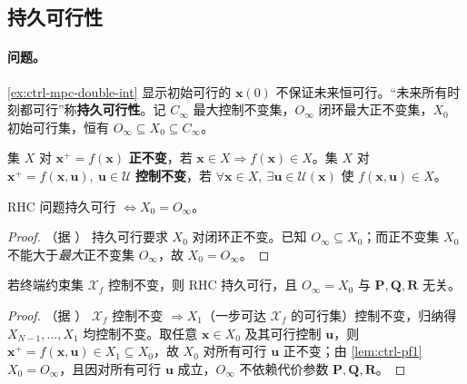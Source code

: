 \subsection{持久可行性}
\label{sec:ctrl-mpc-feasibility}

\paragraph{问题。}
\cref{ex:ctrl-mpc-double-int} 显示初始可行的 $\mathbf{x}(0)$ 不保证未来恒可行。“未来所有时刻都可行”称\textbf{持久可行性}\cite{borrelli2017predictive}。记 $C_\infty$ 最大控制不变集，$O_\infty$ 闭环最大正不变集，$X_0$ 初始可行集，恒有 $O_\infty\subseteq X_0\subseteq C_\infty$。

\begin{definition}[（控制）不变集]
\label{def:ctrl-invariant}
集 $X$ 对 $\mathbf{x}^+=f(\mathbf{x})$ \textbf{正不变}，若 $\mathbf{x}\in X\Rightarrow f(\mathbf{x})\in X$。集 $X$ 对 $\mathbf{x}^+=f(\mathbf{x},\mathbf{u}),\ \mathbf{u}\in\mathcal{U}$ \textbf{控制不变}，若 $\forall\mathbf{x}\in X,\ \exists\mathbf{u}\in\mathcal{U}(\mathbf{x})$ 使 $f(\mathbf{x},\mathbf{u})\in X$。
\end{definition}

\begin{lemma}[持久可行性充要条件]
\label{lem:ctrl-pf1}
RHC 问题持久可行 $\iff X_0=O_\infty$\cite{borrelli2017predictive}。
\end{lemma}
\begin{proof}（据 \cite{borrelli2017predictive}）
持久可行要求 $X_0$ 对闭环正不变。已知 $O_\infty\subseteq X_0$；而正不变集 $X_0$ 不能大于\emph{最大}正不变集 $O_\infty$，故 $X_0=O_\infty$。
\end{proof}

\begin{lemma}
\label{lem:ctrl-pf2}
若终端约束集 $\mathcal{X}_f$ 控制不变，则 RHC 持久可行，且 $O_\infty=X_0$ 与 $\mathbf{P},\mathbf{Q},\mathbf{R}$ 无关\cite{borrelli2017predictive}。
\end{lemma}
\begin{proof}（据 \cite{borrelli2017predictive}）
$\mathcal{X}_f$ 控制不变 $\Rightarrow X_1$（一步可达 $\mathcal{X}_f$ 的可行集）控制不变，归纳得 $X_{N-1},\dots,X_1$ 均控制不变。取任意 $\mathbf{x}\in X_0$ 及其可行控制 $\mathbf{u}$，则 $\mathbf{x}^+=f(\mathbf{x},\mathbf{u})\in X_1\subseteq X_0$，故 $X_0$ 对所有可行 $\mathbf{u}$ 正不变；由 \cref{lem:ctrl-pf1} $X_0=O_\infty$，且因对所有可行 $\mathbf{u}$ 成立，$O_\infty$ 不依赖代价参数 $\mathbf{P},\mathbf{Q},\mathbf{R}$。
\end{proof}

